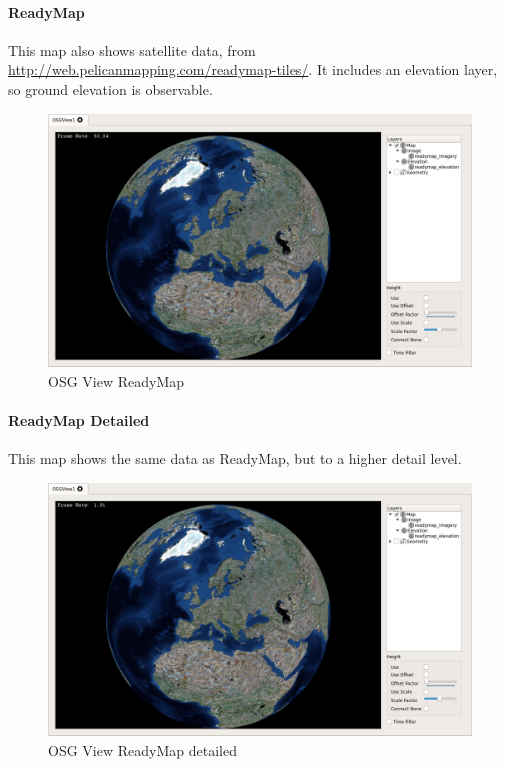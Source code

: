 \documentclass[10pt,letterpaper,extrafontsizes]{memoir}
\begin{document}
{\newpage
\paragraph{ReadyMap}

This map also shows satellite data, from \url{http://web.pelicanmapping.com/readymap-tiles/}. It includes an elevation layer, so ground elevation is observable.

\begin{figure}[H]
    \hspace*{-2cm}
    \includegraphics[width=18cm]{../screenshots/osgview_ready.png}
  \caption{OSG View ReadyMap}
\end{figure}


\paragraph{ReadyMap Detailed}

This map shows the same data as ReadyMap, but to a higher detail level.

\begin{figure}[H]
    \hspace*{-2cm}
    \includegraphics[width=18cm]{../screenshots/osgview_ready_detail.png}
  \caption{OSG View ReadyMap detailed}
\end{figure}


}
\end{document}
